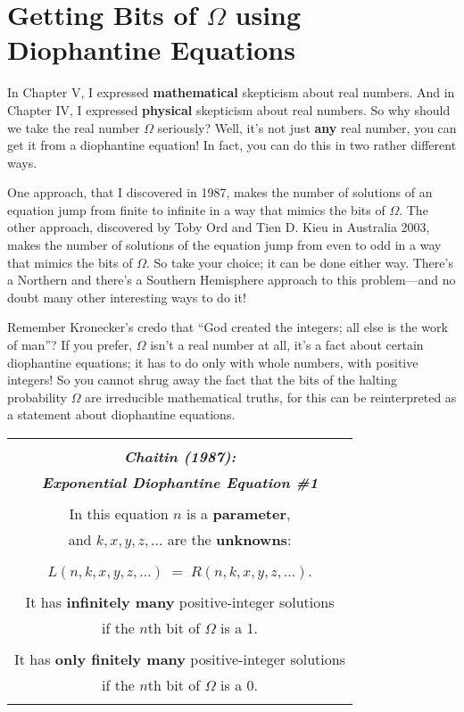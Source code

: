 \documentclass[12pt]{book}
\begin{document}
\section*{Getting Bits of $\Omega$ using Diophantine Equations}

In Chapter V, I expressed \textbf{mathematical} skepticism about real numbers.
And in Chapter IV, I expressed \textbf{physical} skepticism about real numbers.
So why should we take the real number $\Omega$ seriously?
Well, it's not just \textbf{any} real number, you can get it from a diophantine equation!
In fact, you can do this in two rather different ways.  
 
One approach, that I discovered in 1987,
makes the number of solutions of an equation jump from finite to infinite in a way that
mimics the bits of $\Omega$. The other approach, 
discovered by Toby Ord and Tien D. Kieu in Australia 2003,
makes the number of solutions of the equation jump from even to odd in a way that mimics
the bits of $\Omega$. So take your choice; it can be done either way. There's a Northern
and there's a Southern Hemisphere approach to this problem---and no doubt many other 
interesting ways to do it!
 
Remember Kronecker's credo that ``God created the integers; all else is
the work of man''?
If you prefer, $\Omega$ isn't a real number at all, it's a fact about certain diophantine
equations; it has to do only with whole numbers, with positive integers!
So you cannot shrug away the fact that the bits of the halting probability $\Omega$ are
irreducible mathematical truths, for this can be reinterpreted 
as a statement about diophantine equations.
 
\begin{center}
\begin{tabular}{|c|}
\hline
\\
\textbf{\large \emph{Chaitin (1987):}}
\\
\textbf{\large \emph{Exponential Diophantine Equation \#1}}
\\ \\
In this equation $n$ is a \textbf{parameter}, 
\\
and $k, x, y, z, \ldots$ are the \textbf{unknowns}:
\\ \\
$L(n, k, x, y, z, \ldots) \; = \; R(n, k, x, y, z, \ldots)$.
\\ \\
It has \textbf{infinitely many} positive-integer solutions
\\
if the $n$th bit of $\Omega$ is a 1.
\\ \\
It has \textbf{only finitely many} positive-integer solutions
\\
if the $n$th bit of $\Omega$ is a 0.
\\
\\
\hline
\end{tabular}
\end{center}
 
\end{document}
